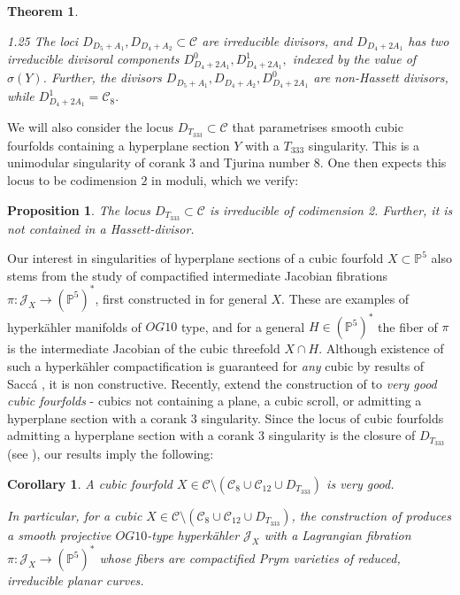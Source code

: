 \documentclass[12pt]{amsart}
\numberwithin{equation}{section}
\theoremstyle{plain}
\newtheorem{theorem}[equation]{Theorem}
\newtheorem{proposition}[equation]{Proposition}
\newtheorem{corollary}[equation]{Corollary}
\theoremstyle{remark}
\theoremstyle{definition}
\newcommand{\bP}{\mathbb{P}}
\newcommand{\calC}{\mathcal{C}}
\newcommand{\calJ}{\mathcal{J}}
\begin{document}
\begin{theorem}\label{Main theorem2}
\begin{spacing}{1.25}
    The loci $D_{D_5+A_1}, D_{D_4+A_2}\subset \calC$ are irreducible divisors, and $D_{D_4+2A_1}$ has two irreducible divisoral components $D_{D_4+2A_1}^0, D_{D_4+2A_1}^1,$ indexed by the value of $\sigma(Y)$. Further, the divisors $D_{D_5+A_1}, D_{D_4+A_2}, D_{D_4+2A_1}^0$ are non-Hassett divisors, while $D_{D_4+2A_1}^1=\calC_8.$
\end{spacing}
\end{theorem}
\vspace{-5mm}
We will also consider the locus $D_{T_{333}}\subset \calC$ that parametrises smooth cubic fourfolds containing a hyperplane section $Y$ with a $T_{333}$ singularity. This is a unimodular singularity of corank $3$ and Tjurina number $8$. One then expects this locus to be codimension $2$ in moduli, which we verify:
\begin{proposition}\label{prop: corank 3}
    The locus $D_{T_{333}}\subset \calC$ is irreducible of codimension 2. Further, it is not contained in a Hassett-divisor. 
\end{proposition}

Our interest in singularities of hyperplane sections of a cubic fourfold $X\subset \bP^5$ also stems from the study of compactified intermediate Jacobian fibrations $\pi:\calJ_X\rightarrow (\bP^5)^*$, first constructed in \cite{LSV} for general $X$. These are examples of hyperk\"ahler manifolds of $OG10$ type, and for a general $H\in (\bP^5)^*$ the fiber of $\pi$ is the intermediate Jacobian of the cubic threefold $X\cap H$. Although existence of such a hyperk\"ahler compactification is guaranteed for \textit{any} cubic by results of Sacc\'a \cite{sac2021birational}, it is non constructive. Recently, \cite{DM26} extend the construction of \cite{LSV} to \textit{very good cubic fourfolds} - cubics not containing a plane, a cubic scroll, or admitting a hyperplane section with a corank 3 singularity. Since the locus of cubic fourfolds admitting a hyperplane section with a corank 3 singularity is the closure of $D_{T_{333}}$ (see ), our results imply the following:
\begin{corollary} \label{verygood}
    A cubic fourfold $X\in \calC\setminus (\calC_8\cup\calC_{12}\cup D_{T_{333}})$ is very good.
    
    In particular, for a cubic $X\in \calC\setminus (\calC_8\cup\calC_{12}\cup D_{T_{333}})$, the construction of \cite{DM26} produces a smooth projective $OG10$-type hyperk\"ahler $\calJ_X$ with a Lagrangian fibration $\pi: \calJ_X\rightarrow (\bP^5)^*$ whose fibers are compactified Prym varieties of reduced, irreducible planar curves.
\end{corollary}
\end{document}
